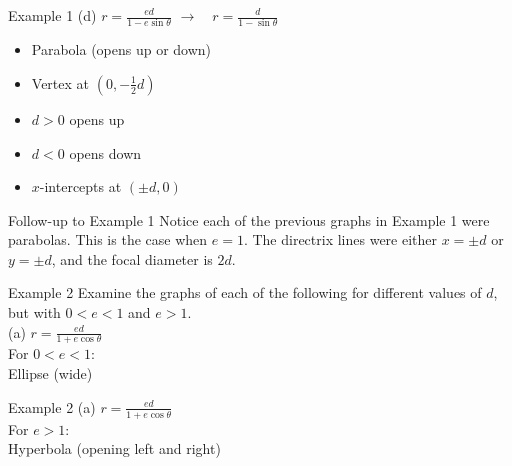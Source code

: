 \documentclass[t,usenames,dvipsnames]{beamer}
\begin{document}
\begin{frame}{Example 1}
(d) \quad   $r = \frac{ed}{1-e\sin\theta}$  \pause    \quad $\longrightarrow \quad r = \frac{d}{1-\sin\theta}$ \newline\\ \pause
    \begin{itemize}
        \item Parabola (opens up or down)  \pause  \newline\\
        \item Vertex at $\left(0, -\frac{1}{2}d\right)$ \pause \newline\\
        \item $d > 0$ opens up    \pause  \newline\\
        \item $d < 0$ opens down   \pause  \newline\\
        \item $x$-intercepts at $\left(\pm d, 0\right)$
    \end{itemize}
\end{frame}

\begin{frame}{Follow-up to Example 1}
Notice each of the previous graphs in Example 1 were parabolas. This is the case when $e = 1$. The directrix lines were either $x = \pm d$ or $y = \pm d$, and the focal diameter is $2d$.
\end{frame}

\begin{frame}{Example 2}
Examine the graphs of each of the following for different values of $d$, but with $0 < e < 1$ and $e > 1$.  \newline\\ 
(a) \quad   $r = \frac{ed}{1+e\cos\theta}$  \newline\\  \pause
For $0 < e < 1$:    \pause  \newline\\

Ellipse (wide)
\end{frame}

\begin{frame}{Example 2}
(a) \quad   $r = \frac{ed}{1+e\cos\theta}$  \newline\\  \pause
For $e > 1$:    \pause  \newline\\

Hyperbola (opening left and right)
\end{frame}
\end{document}
